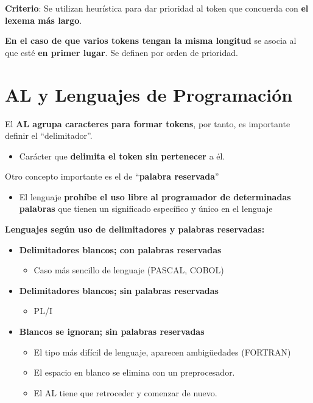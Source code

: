 \documentclass[12pt, twoside, openright]{report} %
\begin{document}
\textbf{Criterio}: Se utilizan heurística para dar prioridad al token
que concuerda con \textbf{el lexema más largo}.

\textbf{En el caso de que varios tokens tengan la misma longitud} se asocia al que
esté \textbf{en primer lugar}. Se definen por orden de prioridad.

\section{AL y Lenguajes de Programación}

El \textbf{AL agrupa caracteres para formar tokens}, por tanto, es
importante definir el ``delimitador''.

\begin{itemize}

\item
  Carácter que \textbf{delimita el token sin pertenecer} a él.
\end{itemize}

Otro concepto importante es el de ``\textbf{palabra reservada}''

\begin{itemize}

\item
  El lenguaje \textbf{prohíbe el uso libre al programador de
  determinadas palabras} que tienen un significado específico y único en
  el lenguaje
\end{itemize}

\textbf{Lenguajes según uso de delimitadores y palabras reservadas:}

\begin{itemize}

\item
  \textbf{Delimitadores blancos; con palabras reservadas}

  \begin{itemize}
  
  \item
    Caso más sencillo de lenguaje (PASCAL, COBOL)
  \end{itemize}
\item
  \textbf{Delimitadores blancos; sin palabras reservadas}

  \begin{itemize}
  
  \item
    PL/I
  \end{itemize}
\item
  \textbf{Blancos se ignoran; sin palabras reservadas}

  \begin{itemize}
  
  \item
    El tipo más difícil de lenguaje, aparecen ambigüedades (FORTRAN)
  \item
    El espacio en blanco se elimina con un preprocesador.
  \item
    El AL tiene que retroceder y comenzar de nuevo.
  \end{itemize}
\end{itemize}
\end{document}
